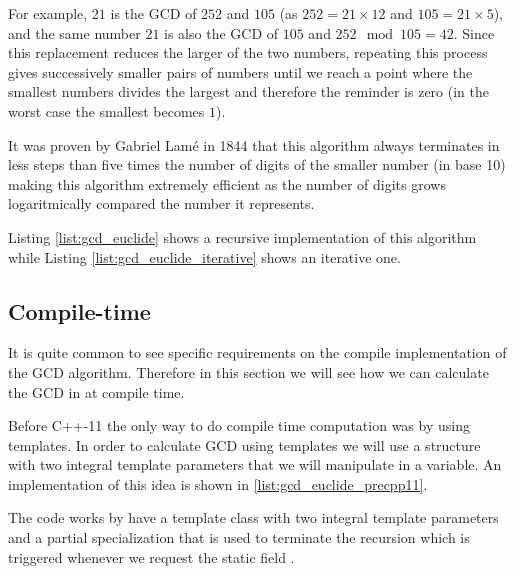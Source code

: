 For example, $21$ is the GCD of $252$ and $105$ (as $252 = 21 \times 12$ and $105 = 21 \times 5$), and the same number $21$ is also the GCD of $105$ and $252 \mod 105 = 42$.
Since this replacement reduces the larger of the two numbers, repeating this process gives successively smaller pairs of numbers until we reach a point where the smallest numbers divides the largest and therefore the reminder is zero (in the worst case the smallest becomes $1$). 

It was proven by Gabriel Lamé in 1844 that this algorithm always terminates in less steps than five times the number of digits of the smaller number (in base 10) making this algorithm extremely efficient as the number of digits grows logaritmically compared the number it represents.

Listing \ref{list:gcd_euclide} shows a recursive implementation of this algorithm while Listing \ref{list:gcd_euclide_iterative} shows an iterative one. 





\subsection{\CC Compile-time}
It is quite common to see specific requirements on the compile implementation of the GCD algorithm. Therefore in this section we will see how we can calculate the GCD in \CC at compile time. 

Before C++-11 the only way to do compile time computation was by using templates. In order to calculate GCD using templates we will use a structure with two integral template parameters that we will manipulate in a  variable. An implementation of this idea is shown in \ref{list:gcd_euclide_precpp11}.



The code works by have a template class with two integral template parameters and a partial specialization that is used to terminate the recursion which is triggered whenever we request the static field .

